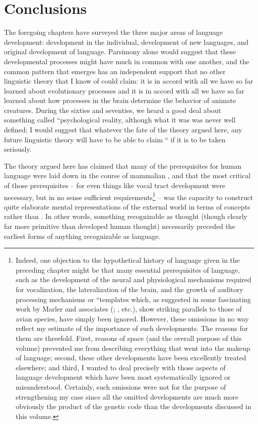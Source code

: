 \chapter{Conclusions}\label{ch:5}

The foregoing chapters have surveyed the three major areas of language development: development in the individual, development of new languages, and original development of language. Parsimony alone would suggest that these developmental processes might have much in common with one another, and the common pattern that emerges has an independent support that no other linguistic theory that I know of could claim: it is in accord with all we have so far learned about evolutionary processes and it is in accord with all we have so far learned about how processes in the brain determine the behavior of animate creatures. During the sixties and seventies, we heard a good deal about something called ``psychological reality, although what it was was never well defined; I would suggest that whatever the fate of the theory argued here, any future linguistic theory will have to be able to claim `` if it is to be taken seriously. 

The theory argued here has claimed that many of the prerequisites for human language were laid down in the course of mammalian , and that the most critical of those prerequisites -- for even things like vocal tract development were necessary, but in no sense sufficient requirements\footnote{Indeed, one objection to the hypothetical history of language given in the preceding chapter might be that many essential prerequi\-sites of language, such as the development of the neural and physiological mechanisms required for vocalization, the lateralization of the brain, and the growth of auditory processing mechanisms or ``templates which, as suggested in some fascinating work by Marler and associates (\citealt{Marler1977,Marler1980}; \citealt{MarlerEtAl1979}, etc.), show striking parallels to those of avian species, have simply been ignored. However, these omissions in no way reflect my estimate of the impor\-tance of such developments. The reasons for them are threefold. First, reasons of space (and the overall purpose of this volume) pre\-vented me from describing everything that went into the makeup of language; second, these other developments have been excellently treated elsewhere; and third, I wanted to deal precisely with those aspects of language development which have been most systematically ignored or misunderstood. Certainly, such omissions were not for the purpose of strengthening my case since all the omitted developments are much more obviously the product of the genetic code than the developments discussed in this volume.} -- was the capacity to construct quite elaborate mental representations of the external world in terms of concepts rather than . In other words, something recognizable as thought (though clearly far more primitive than developed human thought) necessarily preceded the earliest forms of anything recognizable as language.

